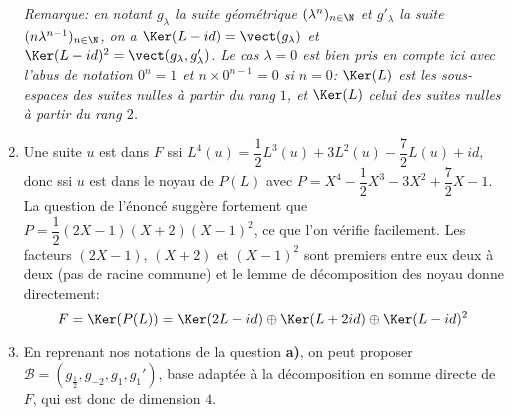 \begin{enonce}
\begin{solution}
\begin{enumerate}[\bfseries a)]
   {\itshape Remarque: en notant  $g_{\lambda}$ la suite géométrique
     $(\lambda^n)_{n\in\N}$ et $g'_{\lambda}$ la suite
     $(n\lambda^{n-1})_{n\in\N}$, on a
     $\Ker(L-id)=\vect(g_\lambda)$ et $\Ker(L-id)^2=\vect(g_\lambda,
     g'_{\lambda})$. Le cas $\lambda=0$ est bien pris en compte ici
     avec l'abus de notation $0^n=1$ et $n\times 0^{n-1}=0$ si
     $n=0$: $\Ker(L)$ 
     est les sous-espaces des suites nulles à partir du rang $1$, et
     $\Ker(L)$ celui des suites nulles à partir du rang $2$.
     }
   \item Une suite $u$ est dans $F$ ssi
     $L^4(u)=\dfrac12L^3(u)+3L^2(u)-\dfrac72L(u)+id$, donc ssi $u$ est
     dans le noyau de $P(L)$ avec
     $P=X^4-\dfrac12X^3-3X^2+\dfrac72X-1$. La question de l'énoncé
     suggère fortement que
     $P=\dfrac12(2X-1)(X+2)(X-1)^2$, ce que l'on vérifie
     facilement. Les facteurs $(2X-1)$, $(X+2)$ et $(X-1)^2$ sont
     premiers entre eux deux à deux (pas de racine commune) et le
     lemme de décomposition des noyau donne directement:
     \[F=\Ker(P(L))=\Ker(2L-id)\oplus\Ker(L+2id)\oplus\Ker(L-id)^2\]
   \item En reprenant nos notations de la question \textbf{a)}, on
     peut proposer $\mathcal{B}=(g_{\frac12}, g_{-2}, g_1,g_1')$, base
     adaptée à la décomposition en somme directe de $F$, qui est donc
     de dimension $4$.
  \end{enumerate}
\end{solution}
\end{enonce}